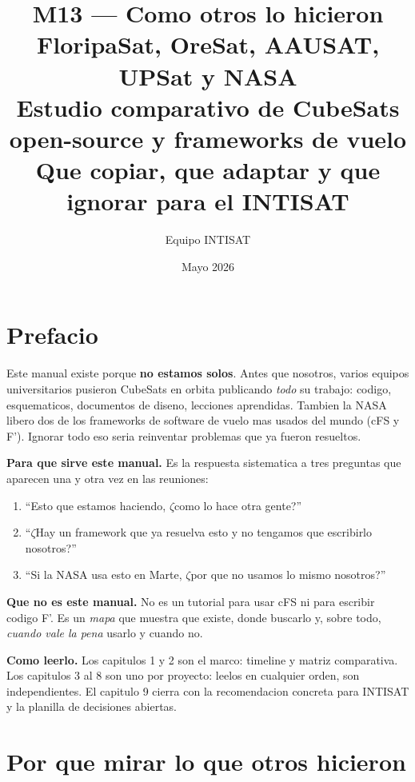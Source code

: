 \documentclass[11pt,a4paper,oneside,openright]{book}
\title{\Huge\bfseries M13 --- Como otros lo hicieron\\[0.3em]
  \LARGE FloripaSat, OreSat, AAUSAT, UPSat y NASA\\[0.5em]
  \large Estudio comparativo de CubeSats open-source y frameworks de vuelo\\
  \normalsize Que copiar, que adaptar y que ignorar para el INTISAT}
\author{Equipo INTISAT}
\date{Mayo 2026}
\begin{document}
\frontmatter
\maketitle

\chapter*{Prefacio}

Este manual existe porque \textbf{no estamos solos}. Antes que nosotros,
varios equipos universitarios pusieron CubeSats en orbita publicando
\emph{todo} su trabajo: codigo, esquematicos, documentos de diseno, lecciones
aprendidas. Tambien la NASA libero dos de los frameworks de software de
vuelo mas usados del mundo (cFS y F'). Ignorar todo eso seria reinventar
problemas que ya fueron resueltos.

\textbf{Para que sirve este manual.} Es la respuesta sistematica a tres
preguntas que aparecen una y otra vez en las reuniones:

\begin{enumerate}[leftmargin=2em]
  \item ``Esto que estamos haciendo, $\zeta$como lo hace otra gente?''
  \item ``$\zeta$Hay un framework que ya resuelva esto y no tengamos que
    escribirlo nosotros?''
  \item ``Si la NASA usa esto en Marte, $\zeta$por que no usamos lo mismo
    nosotros?''
\end{enumerate}

\textbf{Que no es este manual.} No es un tutorial para usar cFS ni para
escribir codigo F'. Es un \emph{mapa} que muestra que existe, donde
buscarlo y, sobre todo, \emph{cuando vale la pena} usarlo y cuando
no.

\textbf{Como leerlo.} Los capitulos 1 y 2 son el marco: timeline y
matriz comparativa. Los capitulos 3 al 8 son uno por proyecto: leelos
en cualquier orden, son independientes. El capitulo 9 cierra con la
recomendacion concreta para INTISAT y la planilla de decisiones
abiertas.

\tableofcontents

\mainmatter

\chapter{Por que mirar lo que otros hicieron}
\end{document}
